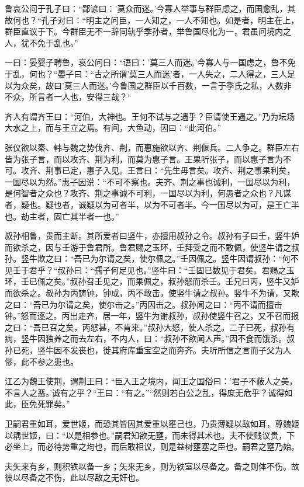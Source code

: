 \documentclass[]{article}
\begin{document}
鲁哀公问于孔子曰：``鄙谚曰：'莫众而迷。'今寡人举事与群臣虑之，而国愈乱，其故何也？``孔子对曰：``明主之问臣，一人知之，一人不知也。如是者，明主在上，群臣直议于下。今群臣无不一辞同轨乎季孙者，举鲁国尽化为一，君虽问境内之人，犹不免于乱也。''

一曰：晏婴子聘鲁，哀公问曰：``语曰：'莫三人而迷。'今寡人与一国虑之，鲁不免于乱，何也？``晏子曰：``古之所谓'莫三人而迷'者，一人失之，二人得之，三人足以为众矣，故曰'莫三人而迷。'今鲁国之群臣以千百数，一言于季氏之私，人数非不众，所言者一人也，安得三哉？``

齐人有谓齐王曰：``河伯，大神也。王何不试与之遇乎？臣请使王遇之。''乃为坛场大水之上，而与王立之焉。有间，大鱼动，因曰：``此河伯。''

张仪欲以秦、韩与魏之势伐齐、荆，而惠施欲以齐、荆偃兵。二人争之。群臣左右皆为张子言，而以攻齐、荆为利，而莫为惠子言。王果听张子，而以惠子言为不可。攻齐、荆事已定，惠子入见。王言曰：``先生毋言矣。攻齐、荆之事果利矣，一国尽以为然。''惠子因说：``不可不察也。夫齐、荆之事也诚利，一国尽以为利，是何智者之众也？攻齐、荆之事诚不可利，一国尽以为利，何愚者之众也？凡谋者，疑也。疑也者，诚疑以为可者半，以为不可者半。今一国尽以为可，是王亡半也。劫主者，固亡其半者一也。''

叔孙相鲁，贵而主断。其所爱者曰竖牛，亦擅用叔孙之令。叔孙有子曰壬，竖牛妒而欲杀之，因与壬游于鲁君所。鲁君赐之玉环，壬拜受之而不敢佩，使竖牛请之叔孙。竖牛欺之曰：``吾已为尔请之矣，使尔佩之。''壬因佩之。竖牛因谓叔孙：``何不见壬于君乎？``叔孙曰：``孺子何足见也。''竖牛曰：``壬固已数见于君矣。君赐之玉环，壬已佩之矣。''叔孙召壬见之，而果佩之，叔孙怒而杀壬。壬兄曰丙，竖牛又妒而欲杀之。叔孙为丙铸钟，钟成，丙不敢击，使竖牛请之叔孙。竖牛不为请，又欺之曰：``吾已为尔请之矣，使尔击之。''丙因击之。叔孙闻之曰：``丙不请而擅击钟。''怒而逐之。丙出走齐，居一年，竖牛为谢叔孙，叔孙使竖牛召之，又不召而报之曰：``吾已召之矣，丙怒甚，不肯来。''叔孙大怒，使人杀之。二子已死，叔孙有病，竖牛因独养之而去左右，不内人，曰：``叔孙不欲闻人声。''因不食而饿杀。叔孙已死，竖牛因不发丧也，徙其府库重宝空之而奔齐。夫听所信之言而子父为人僇，此不参之患也。

江乙为魏王使荆，谓荆王曰：``臣入王之境内，闻王之国俗曰：'君子不蔽人之美，不言人之恶。'诚有之乎？``王曰：``有之。''``然则若白公之乱，得庶无危乎？诚得如此，臣免死罪矣。''

卫嗣君重如耳，爱世姬，而恐其皆因其爱重以壅己也，乃贵薄疑以敌如耳，尊魏姬以耦世姬，曰：``以是相参也。''嗣君知欲无壅，而未得其术也。夫不使贱议贵，下必坐上，而必待势重之均也，而后敢相议，则是益树壅塞之臣也。嗣君之壅乃始。

夫矢来有乡，则积铁以备一乡；矢来无乡，则为铁室以尽备之。备之则体不伤。故彼以尽备之不伤，此以尽敌之无奸也。
\end{document}
